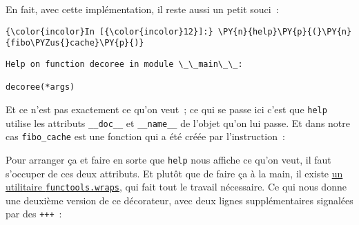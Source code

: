     En fait, avec cette implémentation, il reste aussi un petit souci~:

    \begin{Verbatim}[commandchars=\\\{\},frame=single,framerule=0.3mm,rulecolor=\color{cellframecolor}]
{\color{incolor}In [{\color{incolor}12}]:} \PY{n}{help}\PY{p}{(}\PY{n}{fibo\PYZus{}cache}\PY{p}{)}
\end{Verbatim}


    \begin{Verbatim}[commandchars=\\\{\},frame=single,framerule=0.3mm,rulecolor=\color{cellframecolor}]
Help on function decoree in module \_\_main\_\_:

decoree(*args)
\end{Verbatim}

    Et ce n'est pas exactement ce qu'on veut~; ce qui se passe ici c'est que
\texttt{help} utilise les attributs \texttt{\_\_doc\_\_} et
\texttt{\_\_name\_\_} de l'objet qu'on lui passe. Et dans notre cas
\texttt{fibo\_cache} est une fonction qui a été créée par
l'instruction~:

\begin{Shaded}
\begin{Highlighting}[frame=lines,framerule=0.6mm,rulecolor=\color{asisframecolor}]
\OperatorTok{*}
\end{Highlighting}
\end{Shaded}

    Pour arranger ça et faire en sorte que \texttt{help} nous affiche ce
qu'on veut, il faut s'occuper de ces deux attributs. Et plutôt que de
faire ça à la main, il existe
\href{https://docs.python.org/3/library/functools.html\#functools.wraps}{un
utilitaire \texttt{functools.wraps}}, qui fait tout le travail
nécessaire. Ce qui nous donne une deuxième version de ce décorateur,
avec deux lignes supplémentaires signalées par des \texttt{+++}~:

